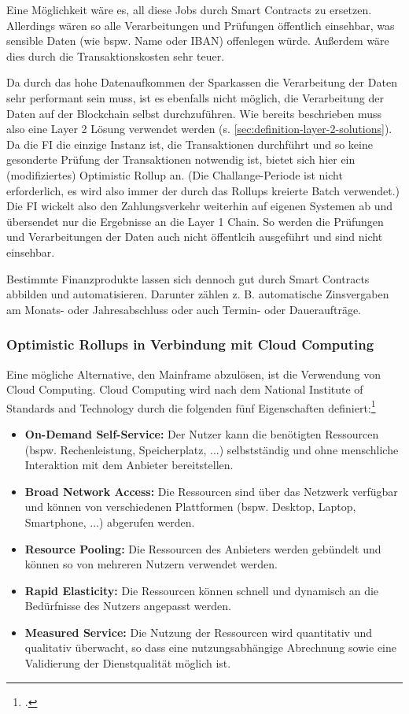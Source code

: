 \documentclass[12pt, a4paper]{article}
\begin{document}
{\noindent
Eine Möglichkeit wäre es, all diese Jobs durch Smart Contracts zu ersetzen.
Allerdings wären so alle Verarbeitungen und Prüfungen öffentlich einsehbar, was sensible Daten (wie bspw. Name oder IBAN) offenlegen würde.
Außerdem wäre dies durch die Transaktionskosten sehr teuer.

\noindent
Da durch das hohe Datenaufkommen der Sparkassen die Verarbeitung der Daten sehr performant sein muss, ist es ebenfalls nicht möglich, die Verarbeitung der Daten auf der Blockchain selbst durchzuführen.
Wie bereits beschrieben muss also eine Layer 2 Lösung verwendet werden (s. \ref{sec:definition-layer-2-solutions}).
Da die FI die einzige Instanz ist, die Transaktionen durchführt und so keine gesonderte Prüfung der Transaktionen notwendig ist, bietet sich hier ein (modifiziertes) Optimistic Rollup an. 
(Die Challange-Periode ist nicht erforderlich, es wird also immer der durch das Rollups kreierte Batch verwendet.)
Die FI wickelt also den Zahlungsverkehr weiterhin auf eigenen Systemen ab und übersendet nur die Ergebnisse an die Layer 1 Chain.
So werden die Prüfungen und Verarbeitungen der Daten auch nicht öffentlcih ausgeführt und sind nicht einsehbar.

\noindent
Bestimmte Finanzprodukte lassen sich dennoch gut durch Smart Contracts abbilden und automatisieren.
Darunter zählen z. B. automatische Zinsvergaben am Monats- oder Jahresabschluss oder auch Termin- oder Daueraufträge.

\subsubsection{Optimistic Rollups in Verbindung mit Cloud Computing}
Eine mögliche Alternative, den Mainframe abzulösen, ist die Verwendung von Cloud Computing.
Cloud Computing wird nach dem National Institute of Standards and Technology durch die folgenden fünf Eigenschaften definiert:\footcite[Vgl. hierzu und zum Folgenden][5]{q11}
\begin{itemize}
    \item \textbf{On-Demand Self-Service:} 
    Der Nutzer kann die benötigten Ressourcen (bspw. Rechenleistung, Speicherplatz, ...) selbstständig und ohne menschliche Interaktion mit dem Anbieter bereitstellen.
    \item \textbf{Broad Network Access:}
    Die Ressourcen sind über das Netzwerk verfügbar und können von verschiedenen Plattformen (bspw. Desktop, Laptop, Smartphone, ...) abgerufen werden.
    \item \textbf{Resource Pooling:}
    Die Ressourcen des Anbieters werden gebündelt und können so von mehreren Nutzern verwendet werden.
    \item \textbf{Rapid Elasticity:}
    Die Ressourcen können schnell und dynamisch an die Bedürfnisse des Nutzers angepasst werden.
    \item \textbf{Measured Service:}
    Die Nutzung der Ressourcen wird quantitativ und qualitativ überwacht, so dass eine nutzungsabhängige Abrechnung sowie eine Validierung der Dienstqualität möglich ist.
\end{itemize}

}
\end{document}
